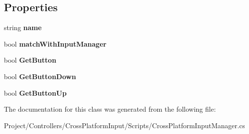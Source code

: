 \subsection*{Properties}
\begin{DoxyCompactItemize}
\item 
\mbox{\label{class_unity_standard_assets_1_1_cross_platform_input_1_1_cross_platform_input_manager_1_1_virtual_button_a2c32a0ba1321140c06327f467ed12071}} 
string {\bfseries name}
\item 
\mbox{\label{class_unity_standard_assets_1_1_cross_platform_input_1_1_cross_platform_input_manager_1_1_virtual_button_a463a12ebf8d58cbc22fd79fb0d5df773}} 
bool {\bfseries match\+With\+Input\+Manager}
\item 
\mbox{\label{class_unity_standard_assets_1_1_cross_platform_input_1_1_cross_platform_input_manager_1_1_virtual_button_a00be3af37f8695641b92263b882f93fa}} 
bool {\bfseries Get\+Button}
\item 
\mbox{\label{class_unity_standard_assets_1_1_cross_platform_input_1_1_cross_platform_input_manager_1_1_virtual_button_af331b4d07b4ba657cf2ef28ec9b6da7b}} 
bool {\bfseries Get\+Button\+Down}
\item 
\mbox{\label{class_unity_standard_assets_1_1_cross_platform_input_1_1_cross_platform_input_manager_1_1_virtual_button_ac1c38eca63e5d5cc12113152bad02011}} 
bool {\bfseries Get\+Button\+Up}
\end{DoxyCompactItemize}


The documentation for this class was generated from the following file\+:\begin{DoxyCompactItemize}
\item 
Project/\+Controllers/\+Cross\+Platform\+Input/\+Scripts/Cross\+Platform\+Input\+Manager.\+cs\end{DoxyCompactItemize}
